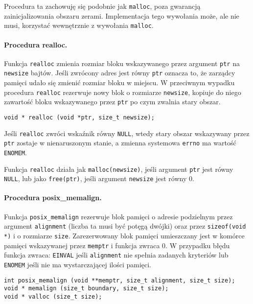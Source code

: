 \documentclass[12pt,a4paper,titlepage,twoside]{mwart}
\begin{document}
Procedura ta zachowuję się podobnie jak \texttt{malloc}, poza gwarancją
zainicjalizowania obszaru zerami. Implementacja tego wywołania może, ale nie
musi, korzystać wewnętrznie z wywołania \texttt{malloc}.

\paragraph{Procedura realloc.}

Funkcja \texttt{realloc} zmienia rozmiar bloku wskazywanego przez argument
\texttt{ptr} na \texttt{newsize} bajtów. Jeśli zwrócony adres jest równy
\texttt{ptr} oznacza to, że zarządcy pamięci udało się zmienić rozmiar bloku w
miejscu. W przeciwnym wypadku procedura \texttt{realloc} rezerwuje nowy blok o
rozmiarze \texttt{newsize}, kopiuje do niego zawartość bloku wskazywanego przez
\texttt{ptr} po czym zwalnia stary obszar.

\vspace{2ex}
\begin{lstlisting}[caption={Prototyp procedury \texttt{realloc}.}]
void * realloc (void *ptr, size_t newsize);
\end{lstlisting}

Jeśli \texttt{realloc} zwróci wskaźnik równy \texttt{NULL}, wtedy stary obszar
wskazywany przez \texttt{ptr} zostaje w nienaruszonym stanie, a zmienna
systemowa \texttt{errno} ma wartość \texttt{ENOMEM}.

Funkcja \texttt{realloc} działa jak \texttt{malloc(newsize)}, jeśli argument
\texttt{ptr} jest równy \texttt{NULL}, lub jako \texttt{free(ptr)}, jeśli
argument \texttt{newsize} jest równy $0$.

\paragraph{Procedura posix\_memalign.}

Funkcja \texttt{posix\_memalign} rezerwuje blok pamięci o adresie podzielnym
przez argument \texttt{alignment} (liczba ta musi być potęgą dwójki) oraz przez
\texttt{sizeof(void *)} i o rozmiarze \texttt{size}. Zarezerwowany blok pamięci
umieszczany jest w komórce pamięci wskazywanej przez \texttt{memptr} i funkcja
zwraca $0$. W przypadku błędu funkcja zwraca: \texttt{EINVAL} jeśli
\texttt{alignment} nie spełnia zadanych kryteriów lub \texttt{ENOMEM} jeśli nie
ma wystarczającej ilości pamięci.

\vspace{2ex}
\begin{lstlisting}[caption={Prototyp procedury \texttt{posix\_memalign}, \texttt{memalign} i \texttt{valloc}.},xleftmargin=0cm,xrightmargin=0cm]
int posix_memalign (void **memptr, size_t alignment, size_t size);
void * memalign (size_t boundary, size_t size);
void * valloc (size_t size);
\end{lstlisting}
\end{document}

